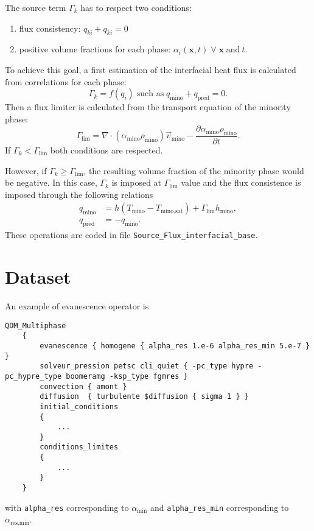 The source term $\Gamma_{k}$ has to respect two conditions:
\begin{enumerate}
    \item flux consistency: $q_{k i} + q_{k i} =0$
    \item positive volume fractions for each phase: $\alpha_i(\boldsymbol{x},t) \; \forall \; \boldsymbol{x} \; \textrm{and} \ t $. 
\end{enumerate}
To achieve this goal, a first estimation of the interfacial heat flux is calculated from correlations for each phase:
\begin{equation}
    \label{eq:evanescence_clipping}
    \Gamma_{k} = f(q_{i}) \; \text{such as} \; q_{\text{mino}} + q_{\text{pred}} = 0.
\end{equation}
Then a flux limiter is calculated from the transport equation of the minority phase:
\begin{equation}
    \label{eq:evanescence_Glim}
    \Gamma_{\text{lim}}=\nabla \cdot (\alpha_{\text{mino}}\rho_{\text{mino}})\overrightarrow{v}_{\text{mino}}-\frac{\partial \alpha_{\text{mino}}\rho_{\text{mino}}}{\partial t}.
\end{equation}
If $\Gamma_{k} < \Gamma_{\text{lim}}$ both conditions are respected. 

However, if $\Gamma_{k} \geq \Gamma_{\text{lim}}$, the resulting volume fraction of the minority phase would be negative. 
In this case, $\Gamma_{k}$ is imposed at $\Gamma_{\text{lim}}$ value and the flux consistence is imposed through the following relations
\begin{align}
    q_{\text{mino}} &= h \left( T_{\text{mino}}-T_{\textrm{mino,sat}} \right) + \Gamma_{\text{lim}} h_{\text{mino}},\\
    q_{\text{pred}} &= -q_{\text{mino}}.
\end{align}
These operations are coded in file \texttt{Source\_Flux\_interfacial\_base}.

\section{Dataset\label{sec:eva-dataset}}

An example of evanescence operator is 
\begin{lstlisting}[caption={data set definition},captionpos=b,escapechar=|]
    QDM_Multiphase
    {
        evanescence { homogene { alpha_res 1.e-6 alpha_res_min 5.e-7 } }
        solveur_pression petsc cli_quiet { -pc_type hypre -pc_hypre_type boomeramg -ksp_type fgmres }
        convection { amont }
        diffusion  { turbulente $diffusion { sigma 1 } }
        initial_conditions
        {
            ...
        }
        conditions_limites
        {
            ...
        }
    }
\end{lstlisting}
with \texttt{alpha\_res} corresponding to $\alpha_{\textrm{min}}$ and \texttt{alpha\_res\_min} corresponding to $\alpha_{\textrm{res,min}}$.


